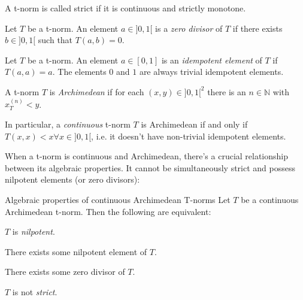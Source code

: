\begin{definition}
  A t-norm is called strict if it is continuous and strictly monotone.
\end{definition}


\begin{definition}
Let $T$ be a t-norm. An element $a \in ]0,1[$ is a \emph{zero divisor} of $T$ if there exists $b \in ]0,1[$ such that $T(a,b)=0$.
\end{definition}

\begin{definition}
  Let $T$ be a t-norm. An element $a \in [0,1]$ is an \emph{idempotent element} of $T$ if $T(a,a)=a$. The elements $0$ and $1$ are always trivial idempotent elements.
  \end{definition}
  

\begin{definition}
A t-norm $T$ is \emph{Archimedean} if for each $(x,y) \in ]0,1[^2$ there is an $n \in \mathbb{N}$ with $x_T^{(n)} < y$. \cite[Def.~2.9]{Klement2000}  

In particular, a \textit{continuous} t-norm $T$ is Archimedean if and only if $T(x,x) < x \forall x \in ]0,1[$, i.e. it doesn't have non-trivial idempotent elements. \cite[Thm.~2.12]{Klement2000}
\end{definition}


When a t-norm is continuous and Archimedean, there's a crucial relationship between its algebraic properties. It cannot be simultaneously strict and possess nilpotent elements (or zero divisors):

\begin{theorem}{Algebraic properties of continuous Archimedean T-norms \cite[Thm.~2.18]{Klement2000}}\label{thm:alg_arch_cont}
Let $T$ be a continuous Archimedean t-norm. Then the following are equivalent:
\begin{romanenum}
    \item $T$ is \emph{nilpotent}.
    \item There exists some nilpotent element of $T$.
    \item There exists some zero divisor of $T$.
    \item $T$ is not \emph{strict}.
\end{romanenum}
\end{theorem}




